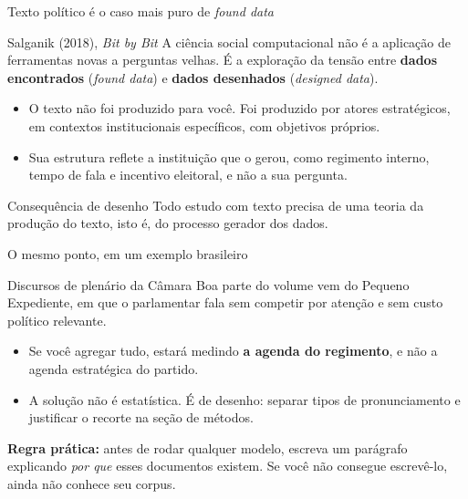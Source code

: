 \documentclass[11pt,aspectratio=169]{beamer}
\begin{document}
\begin{frame}{Texto político é o caso mais puro de \emph{found data}}
\begin{block}{Salganik (2018), \emph{Bit by Bit}}
A ciência social computacional não é a aplicação de ferramentas novas a
perguntas velhas. É a exploração da tensão entre \textbf{dados encontrados}
(\emph{found data}) e \textbf{dados desenhados} (\emph{designed data}).
\end{block}
\vspace{0.25cm}
\begin{itemize}\small
  \item O texto não foi produzido para você. Foi produzido por atores
        estratégicos, em contextos institucionais específicos, com objetivos
        próprios.
  \item Sua estrutura reflete a instituição que o gerou, como regimento interno,
        tempo de fala e incentivo eleitoral, e não a sua pergunta.
\end{itemize}
\pause
\vspace{0.2cm}
\begin{alertblock}{Consequência de desenho}
\small Todo estudo com texto precisa de uma teoria da produção do texto, isto é,
do processo gerador dos dados.
\end{alertblock}
\end{frame}

\begin{frame}{O mesmo ponto, em um exemplo brasileiro}
\begin{block}{Discursos de plenário da Câmara}
Boa parte do volume vem do Pequeno Expediente, em que o parlamentar fala sem
competir por atenção e sem custo político relevante.
\end{block}
\vspace{0.35cm}
\begin{itemize}
  \item Se você agregar tudo, estará medindo \textbf{a agenda do regimento},
        e não a agenda estratégica do partido.
  \item A solução não é estatística. É de desenho: separar tipos de
        pronunciamento e justificar o recorte na seção de métodos.
\end{itemize}
\pause
\vspace{0.3cm}
\centering
\small \textbf{Regra prática:} antes de rodar qualquer modelo, escreva um
parágrafo explicando \emph{por que} esses documentos existem. Se você não
consegue escrevê-lo, ainda não conhece seu corpus.
\end{frame}
\end{document}
